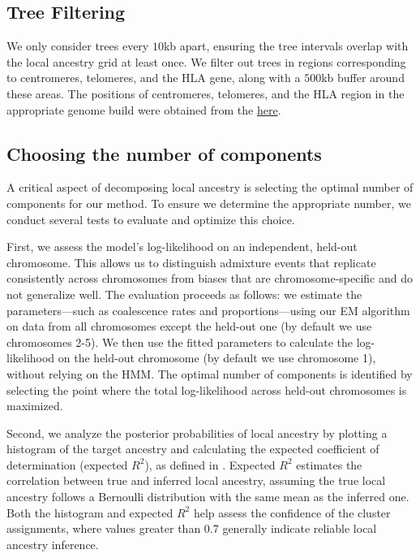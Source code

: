 \subsection{Tree Filtering}

We only consider trees every $10$kb apart, ensuring the tree intervals overlap with the local ancestry grid at least once.
%
%
We filter out trees in regions corresponding to centromeres, telomeres, and the HLA gene, along with a $500$kb buffer around these areas. The positions of centromeres, telomeres, and the HLA region in the appropriate genome build were obtained from the \href{https://genome.ucsc.edu/goldenPath/help/ftp.html}{here}.
%

\subsection{Choosing the number of components}
\label{sec:ch2-gb-selecting-clusters}

A critical aspect of decomposing local ancestry is selecting the optimal number of components for our method. To ensure we determine the appropriate number, we conduct several tests to evaluate and optimize this choice.

First, we assess the model’s log-likelihood on an independent, held-out chromosome. This allows us to distinguish admixture events that replicate consistently across chromosomes from biases that are chromosome-specific and do not generalize well. The evaluation proceeds as follows: we estimate the parameters—such as coalescence rates and proportions—using our EM algorithm on data from all chromosomes except the held-out one (by default we use chromosomes 2-5). We then use the fitted parameters to calculate the log-likelihood on the held-out chromosome (by default we use chromosome 1), without relying on the HMM. The optimal number of components is identified by selecting the point where the total log-likelihood across held-out chromosomes is maximized.

Second, we analyze the posterior probabilities of local ancestry by plotting a histogram of the target ancestry and calculating the expected coefficient of determination (expected $R^2$), as defined in \cite{price2009sensitive,salter2019fine}. Expected $R^2$ estimates the correlation between true and inferred local ancestry, assuming the true local ancestry follows a Bernoulli distribution with the same mean as the inferred one. Both the histogram and expected $R^2$ help assess the confidence of the cluster assignments, where values greater than 0.7 generally indicate reliable local ancestry inference. 

